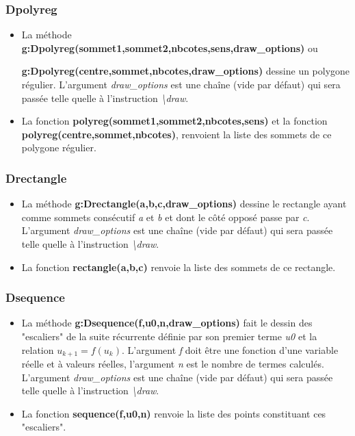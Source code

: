 \subsubsection{Dpolyreg}
\begin{itemize}
    \item La méthode \textbf{g:Dpolyreg(sommet1,sommet2,nbcotes,sens,draw\_options)} ou \par \textbf{g:Dpolyreg(centre,sommet,nbcotes,draw\_options)} dessine un polygone régulier. L'argument \emph{draw\_options} est une chaîne (vide par défaut) qui sera passée telle quelle à l'instruction \emph{\textbackslash draw}.
    \item La fonction \textbf{polyreg(sommet1,sommet2,nbcotes,sens)} et la fonction \textbf{polyreg(centre,sommet,nbcotes)}, renvoient la liste des sommets de ce polygone régulier.
\end{itemize}

\subsubsection{Drectangle}
\begin{itemize}
    \item La méthode \textbf{g:Drectangle(a,b,c,draw\_options)} dessine le rectangle ayant comme sommets consécutif \emph{a} et \emph{b} et dont le côté opposé passe par \emph{c}. L'argument \emph{draw\_options} est une chaîne (vide par défaut) qui sera passée telle quelle à l'instruction \emph{\textbackslash draw}.
    \item La fonction \textbf{rectangle(a,b,c)} renvoie la liste des sommets de ce rectangle.
\end{itemize}

\subsubsection{Dsequence}
\begin{itemize}
    \item La méthode \textbf{g:Dsequence(f,u0,n,draw\_options)} fait le dessin des "escaliers" de la suite récurrente définie par son premier terme \emph{u0} et la relation \(u_{k+1}=f(u_k)\). L'argument \emph{f} doit être une fonction d'une variable réelle et à valeurs réelles, l'argument \emph{n} est le nombre de termes calculés. L'argument \emph{draw\_options} est une chaîne (vide par défaut) qui sera passée telle quelle à l'instruction \emph{\textbackslash draw}.
    \item La fonction \textbf{sequence(f,u0,n)} renvoie la liste des points constituant ces "escaliers".
\end{itemize}

